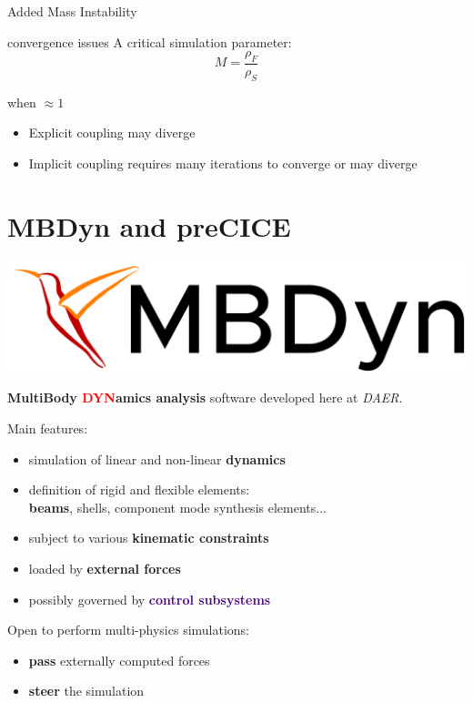 \documentclass[10pt,t]{beamer}
\begin{document}
\begin{frame}{Added Mass Instability}

\begin{alertblock}{convergence issues}
A critical simulation parameter:
\begin{equation}
    M = \frac{\rho_F}{\rho_S}
\end{equation}

when $\approx 1$

\end{alertblock}

    \begin{itemize}
        \item Explicit coupling may diverge
        \item Implicit coupling requires many iterations to converge or may diverge 
    \end{itemize}
\end{frame}




\section{MBDyn and preCICE}

\begin{frame}{\includegraphics[width=.18\textwidth]{images/mbdyn.png}}

\textbf{\textcolor{dorange}{M}ulti\textcolor{dorange}{B}ody \textcolor{red}{DYN}amics analysis} software developed here at \textit{DAER}.\\

\pause
\vspace{5mm}

Main features:

    \begin{itemize}
        \item simulation of linear and non-linear \textbf{\textcolor{dorange}{dynamics}}
        \item definition of rigid and flexible elements:\\ \textbf{\textcolor{dblue}{beams}}, shells, component mode synthesis elements...
        \item subject to various \textbf{\textcolor{pblue}{kinematic constraints}}
        \item loaded by \textbf{\textcolor{fgreen}{external forces}}
        \item possibly governed by \textbf{\textcolor{indigo}{control subsystems}}
    \end{itemize}

\pause
\vspace{5mm}

Open to perform multi-physics simulations:
\begin{itemize}
    \item \textbf{pass} externally computed forces
    \item \textbf{steer} the simulation
\end{itemize}

\end{frame}
\end{document}
